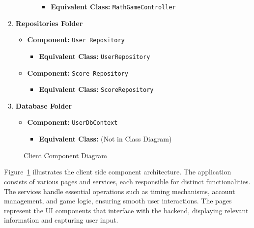\documentclass[11pt,a4paper]{article}
\newcommand{\inputdiagram}[1]{}
\newcommand{\textwidthdiagram}[2][1]{%
  \resizebox{#1\textwidth}{!}{\inputdiagram{#2}}%
}
\begin{document}
\begin{enumerate}[label=\textbf{\arabic*.}, ref=\arabic*]
\begin{enumerate}[label=\textbf{\alph*.}, ref=\theenumi.\alph*]
\begin{itemize}
                        \begin{itemize}
                            \item \textbf{Equivalent Class:} \texttt{MathGameController}
                        \end{itemize}
                \end{itemize}
        \end{enumerate}
    \item \textbf{Repositories Folder}
        \begin{itemize}
            \item \textbf{Component:} \texttt{User Repository}
                \begin{itemize}
                    \item \textbf{Equivalent Class:} \texttt{UserRepository}
                \end{itemize}
            \item \textbf{Component:} \texttt{Score Repository}
                \begin{itemize}
                    \item \textbf{Equivalent Class:} \texttt{ScoreRepository}
                \end{itemize}
        \end{itemize}
    \item \textbf{Database Folder}
        \begin{itemize}
            \item \textbf{Component:} \texttt{UserDbContext}
                \begin{itemize}
                    \item \textbf{Equivalent Class:} (Not in Class Diagram)
                \end{itemize}
        \end{itemize}
\end{enumerate}





\begin{figure}[H]
    \centering
    \textwidthdiagram{client_components.tex}
    \caption{Client Component Diagram}
    \label{fig:client_components}
\end{figure}

Figure~\ref{fig:client_components} illustrates the client side component architecture. The application consists of various pages and services, each responsible for distinct functionalities. The services handle essential operations such as timing mechanisms, account management, and game logic, ensuring smooth user interactions. The pages represent the UI components that interface with the backend, displaying relevant information and capturing user input.
\end{document}
